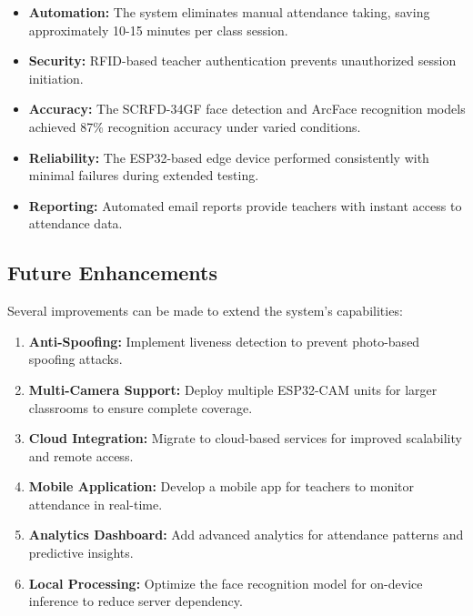 \documentclass[12pt,a4paper]{article}
\begin{document}
\begin{itemize}
	\item \textbf{Automation:} The system eliminates manual attendance taking, saving approximately 10-15 minutes per class session.

	\item \textbf{Security:} RFID-based teacher authentication prevents unauthorized session initiation.

	\item \textbf{Accuracy:} The SCRFD-34GF face detection and ArcFace recognition models achieved 87\% recognition accuracy under varied conditions.

	\item \textbf{Reliability:} The ESP32-based edge device performed consistently with minimal failures during extended testing.

	\item \textbf{Reporting:} Automated email reports provide teachers with instant access to attendance data.
\end{itemize}

\subsection{Future Enhancements}
Several improvements can be made to extend the system's capabilities:

\begin{enumerate}
	\item \textbf{Anti-Spoofing:} Implement liveness detection to prevent photo-based spoofing attacks.

	\item \textbf{Multi-Camera Support:} Deploy multiple ESP32-CAM units for larger classrooms to ensure complete coverage.

	\item \textbf{Cloud Integration:} Migrate to cloud-based services for improved scalability and remote access.

	\item \textbf{Mobile Application:} Develop a mobile app for teachers to monitor attendance in real-time.

	\item \textbf{Analytics Dashboard:} Add advanced analytics for attendance patterns and predictive insights.

	\item \textbf{Local Processing:} Optimize the face recognition model for on-device inference to reduce server dependency.
\end{enumerate}
\end{document}
